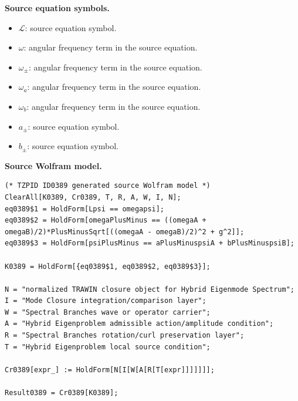 \begin{minipage}[t]{0.49\linewidth}
\begingroup
\small
\raggedright
\textbf{Source equation symbols.}\par
\begin{itemize}[leftmargin=1.35em,itemsep=1pt,topsep=1pt,parsep=0pt]
    \item $\mathcal{L}$: source equation symbol.
    \item $\omega$: angular frequency term in the source equation.
    \item $\omega_{\pm}$: angular frequency term in the source equation.
    \item $\omega_a$: angular frequency term in the source equation.
    \item $\omega_b$: angular frequency term in the source equation.
    \item $a_{\pm}$: source equation symbol.
    \item $b_{\pm}$: source equation symbol.
\end{itemize}
\endgroup
\end{minipage}\hfill
\begin{minipage}[t]{0.47\linewidth}
\begingroup
\scriptsize
\raggedright
\textbf{Source Wolfram model.}\par
\begin{Verbatim}[fontsize=\tiny,breaklines=true,breakanywhere=true]
(* TZPID ID0389 generated source Wolfram model *)
ClearAll[K0389, Cr0389, T, R, A, W, I, N];
eq0389$1 = HoldForm[Lpsi == omegapsi];
eq0389$2 = HoldForm[omegaPlusMinus == ((omegaA + omegaB)/2)*PlusMinusSqrt[((omegaA - omegaB)/2)^2 + g^2]];
eq0389$3 = HoldForm[psiPlusMinus == aPlusMinuspsiA + bPlusMinuspsiB];

K0389 = HoldForm[{eq0389$1, eq0389$2, eq0389$3}];

N = "normalized TRAWIN closure object for Hybrid Eigenmode Spectrum";
I = "Mode Closure integration/comparison layer";
W = "Spectral Branches wave or operator carrier";
A = "Hybrid Eigenproblem admissible action/amplitude condition";
R = "Spectral Branches rotation/curl preservation layer";
T = "Hybrid Eigenproblem local source condition";

Cr0389[expr_] := HoldForm[N[I[W[A[R[T[expr]]]]]]];

Result0389 = Cr0389[K0389];
\end{Verbatim}
\endgroup
\end{minipage}

